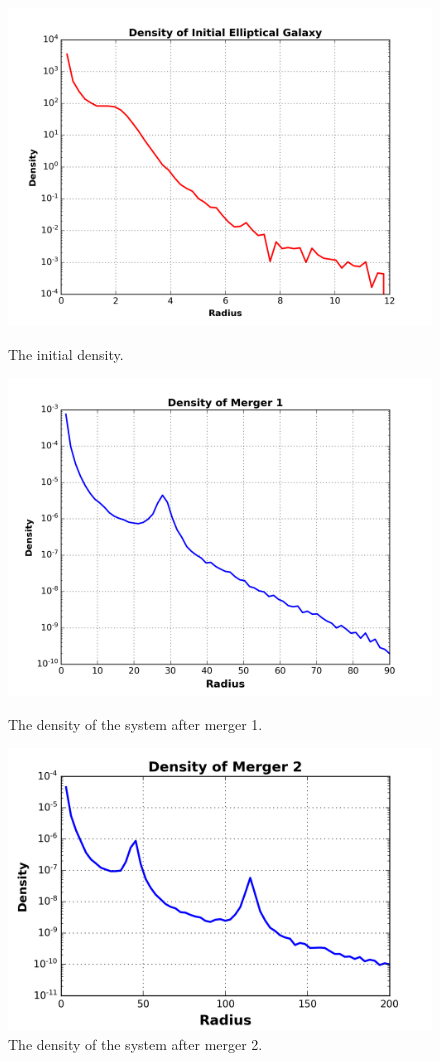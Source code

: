 \documentclass[12pt]{report}
\begin{document}
\begin{figure}[!htb]
  \includegraphics[width=\linewidth]{initial_density.png}
  \caption{The initial density.}
  \label{fig:density_initial}
\endminipage\hfill
{}
  \includegraphics[width=\linewidth]{density_merger1.png}
  \caption{The density of the system after merger 1.}\label{fig:density_merger1}
\endminipage\hfill
{}
  \includegraphics[width=\linewidth]{density_merger2.png}
  \caption{The density of the system after merger 2.}
  \label{fig:density_merger2}
\endminipage\hfill


\end{figure}
\end{document}

